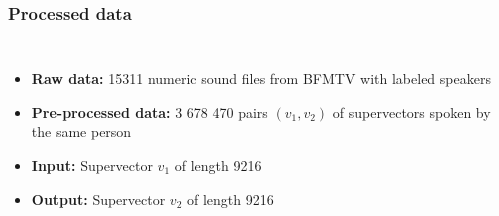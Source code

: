 \documentclass[11pt,english]{beamer}
\begin{document}
\begin{frame}
  \frametitle{Processed data}

  \begin{columns}
    \begin{itemize}
\setlength\itemsep{2em}
    \item \textbf{Raw data:} 15311 numeric sound files from BFMTV with labeled speakers
    \item \textbf{Pre-processed data:} 3 678 470 pairs $(v_1,v_2)$ of supervectors
      spoken by the same person
    \item \textbf{Input:} Supervector $v_1$ of length 9216
    \item \textbf{Output:} Supervector $v_2$ of length 9216

    \end{itemize}

  \end{columns}
  
\end{frame}
\end{document}
